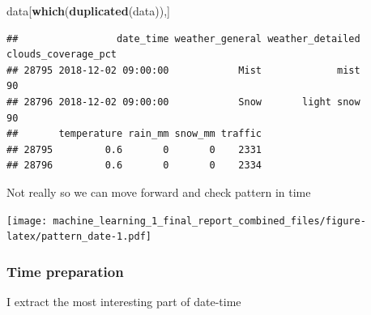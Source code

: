 \documentclass[
]{article}
\newenvironment{Shaded}{\begin{snugshade}}{\end{snugshade}}
\newcommand{\DataTypeTok}[1]{\textcolor[rgb]{0.13,0.29,0.53}{#1}}
\newcommand{\KeywordTok}[1]{\textcolor[rgb]{0.13,0.29,0.53}{\textbf{#1}}}
\newcommand{\NormalTok}[1]{#1}
\newcommand{\OperatorTok}[1]{\textcolor[rgb]{0.81,0.36,0.00}{\textbf{#1}}}
\newcommand{\StringTok}[1]{\textcolor[rgb]{0.31,0.60,0.02}{#1}}
\begin{document}
\begin{Shaded}
\begin{Highlighting}[]
\NormalTok{data[}\KeywordTok{which}\NormalTok{(}\KeywordTok{duplicated}\NormalTok{(data)),]}
\end{Highlighting}
\end{Shaded}

\begin{verbatim}
##                 date_time weather_general weather_detailed clouds_coverage_pct
## 28795 2018-12-02 09:00:00            Mist             mist                  90
## 28796 2018-12-02 09:00:00            Snow       light snow                  90
##       temperature rain_mm snow_mm traffic
## 28795         0.6       0       0    2331
## 28796         0.6       0       0    2334
\end{verbatim}

Not really so we can move forward and check pattern in time

\texttt{[image: machine\_learning\_1\_final\_report\_combined\_files/figure-latex/pattern\_date-1.pdf]}

\hypertarget{time-preparation}{%
\subsubsection{Time preparation}\label{time-preparation}}

I extract the most interesting part of date-time

\begin{Shaded}
\end{Shaded}
\end{document}
